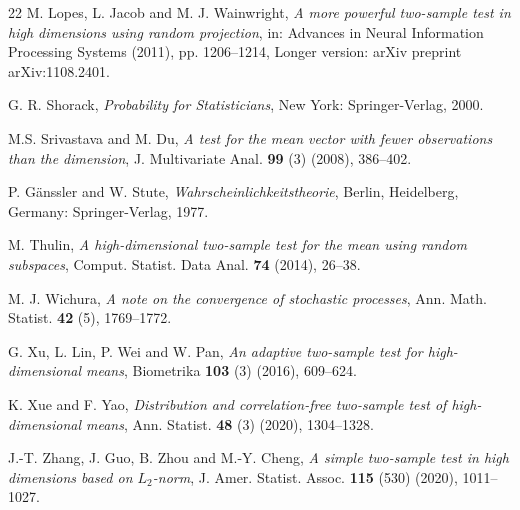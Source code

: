 \documentclass[sn-mathphys,Numbered]{sn-jnl}%
\theoremstyle{thmstyleone}%
\theoremstyle{thmstyletwo}%
\theoremstyle{thmstylethree}%
\begin{document}
\begin{thebibliography}{22}
 M. Lopes, L. Jacob and M. J. Wainwright, \textit{A more powerful two-sample test in high dimensions using random projection}, in: Advances in Neural Information Processing Systems (2011), pp. 1206--1214, Longer version: arXiv preprint arXiv:1108.2401.

 G. R. Shorack, \textit{Probability for Statisticians}, New York: Springer-Verlag, 2000.

 M.S. Srivastava and M. Du, \textit{A test for the mean vector with fewer observations than the dimension}, J. Multivariate Anal. \textbf{99} (3) (2008), 386--402.

 P. G\"{a}nssler and W. Stute, \textit{Wahrscheinlichkeitstheorie}, Berlin, Heidelberg, Germany: Springer-Verlag, 1977.

 M. Thulin, \textit{A high-dimensional two-sample test for the mean using random subspaces}, Comput. Statist. Data Anal. \textbf{74} (2014), 26--38.

 M. J. Wichura, \textit{A note on the convergence of stochastic processes}, Ann. Math. Statist. \textbf{42} (5), 1769--1772.

 G. Xu, L. Lin, P. Wei and W. Pan, \textit{An adaptive two-sample test for high-dimensional means}, Biometrika \textbf{103} (3) (2016), 609--624.

 K. Xue and F. Yao, \textit{Distribution and correlation-free two-sample test of high-dimensional means}, Ann. Statist. \textbf{48} (3) (2020), 1304--1328.

 J.-T. Zhang, J. Guo, B. Zhou and M.-Y. Cheng, \textit{A simple two-sample test in high dimensions based on $L_2$-norm}, J. Amer. Statist. Assoc. \textbf{115} (530) (2020), 1011--1027.

\end{thebibliography}
\end{document}
